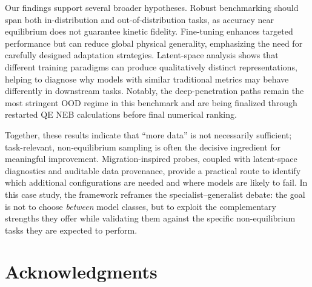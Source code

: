 \documentclass[pdflatex,sn-mathphys-num]{sn-jnl}%
\providecommand{\reviewermap}[3]{}
\theoremstyle{thmstyleone}%
\theoremstyle{thmstyletwo}%
\theoremstyle{thmstylethree}%
\begin{document}
\reviewermap{REV-A4}{done-local}{Broader principles are now framed as case-study hypotheses requiring cross-system validation.}
Our findings support several broader hypotheses. Robust benchmarking should span both in-distribution and out-of-distribution tasks, as accuracy near equilibrium does not guarantee kinetic fidelity. Fine-tuning enhances targeted performance but can reduce global physical generality, emphasizing the need for carefully designed adaptation strategies. Latent-space analysis shows that different training paradigms can produce qualitatively distinct representations, helping to diagnose why models with similar traditional metrics may behave differently in downstream tasks. Notably, the deep-penetration paths remain the most stringent OOD regime in this benchmark and are being finalized through restarted QE NEB calculations before final numerical ranking.

\reviewermap{REV-A4}{done-local}{Conclusion should keep framework generality as future validation rather than a final claim.}
Together, these results indicate that ``more data'' is not necessarily sufficient; task-relevant, non-equilibrium sampling is often the decisive ingredient for meaningful improvement. Migration-inspired probes, coupled with latent-space diagnostics and auditable data provenance, provide a practical route to identify which additional configurations are needed and where models are likely to fail. In this case study, the framework reframes the specialist--generalist debate: the goal is not to choose \textit{between} model classes, but to exploit the complementary strengths they offer while validating them against the specific non-equilibrium tasks they are expected to perform.

\section*{Acknowledgments}
\end{document}
